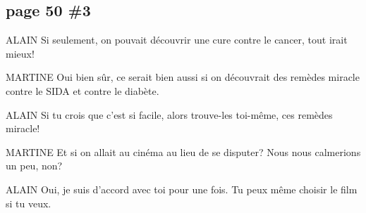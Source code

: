 \documentclass[letterpaper]{article}
\begin{document}
\doublespacing
\subsection*{page 50 \#3}
ALAIN    Si seulement, on pouvait découvrir une cure contre le cancer, tout irait mieux!

MARTINE    Oui bien sûr, ce serait bien aussi si on découvrait des remèdes miracle contre le SIDA et contre le diabète.

ALAIN    Si tu crois que c'est si facile, alors trouve-les toi-même, ces remèdes miracle!

MARTINE    Et si on allait au cinéma au lieu de se disputer? Nous nous calmerions un peu, non?

ALAIN    Oui, je suis d'accord avec toi pour une fois. Tu peux même choisir le film si tu veux.
\end{document}
